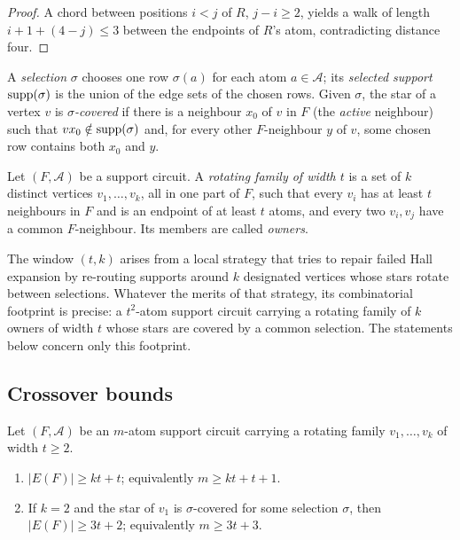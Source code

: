 \begin{proof}
A chord between positions \(i<j\) of \(R\), \(j-i\ge2\), yields a walk
of length \(i+1+(4-j)\le3\) between the endpoints of \(R\)'s atom,
contradicting distance four.
\end{proof}

\begin{definition}\label{def:t4:selection}
A \emph{selection} \(\sigma\) chooses one row \(\sigma(a)\) for each
atom \(a\in\mathcal A\); its \emph{selected support}
\(\operatorname{supp}(\sigma)\) is the union of the edge sets of the chosen rows.
Given \(\sigma\), the star of a vertex \(v\) is
\emph{\(\sigma\)-covered} if there is a neighbour \(x_0\) of \(v\)
in \(F\) (the \emph{active} neighbour) such that
\(vx_0\notin\operatorname{supp}(\sigma)\) and, for every other \(F\)-neighbour
\(y\) of \(v\), some chosen row contains both \(x_0\) and \(y\).
\end{definition}

\begin{definition}\label{def:t4:rotating}
Let \((F,\mathcal A)\) be a support circuit. A \emph{rotating family of
width \(t\)} is a set of \(k\) distinct vertices
\(v_1,\dots,v_k\), all in one part of \(F\), such that every \(v_i\)
has at least \(t\) neighbours in \(F\) and is an endpoint of at least
\(t\) atoms, and every two \(v_i,v_j\) have a common \(F\)-neighbour.
Its members are called \emph{owners}.
\end{definition}

The window \((t,k)\) arises from a local strategy that tries to repair
failed Hall expansion by re-routing supports around \(k\) designated
vertices whose stars rotate between selections. Whatever the merits of
that strategy, its combinatorial footprint is precise: a
\(t^2\)-atom support circuit carrying a rotating family of \(k\) owners
of width \(t\) whose stars are covered by a common selection. The
statements below concern only this footprint.

\subsection{Crossover bounds}\label{subsec:t4:crossover}

\begin{theorem}\label{thm:t4:crossover}
Let \((F,\mathcal A)\) be an \(m\)-atom support circuit carrying a
rotating family \(v_1,\dots,v_k\) of width \(t\ge2\).
\begin{enumerate}[label=\textup{(\roman*)}]
\item \(|E(F)|\ge kt+t\); equivalently \(m\ge kt+t+1\).
\item If \(k=2\) and the star of \(v_1\) is \(\sigma\)-covered for some
selection \(\sigma\), then \(|E(F)|\ge3t+2\); equivalently
\(m\ge3t+3\).
\end{enumerate}
\end{theorem}

